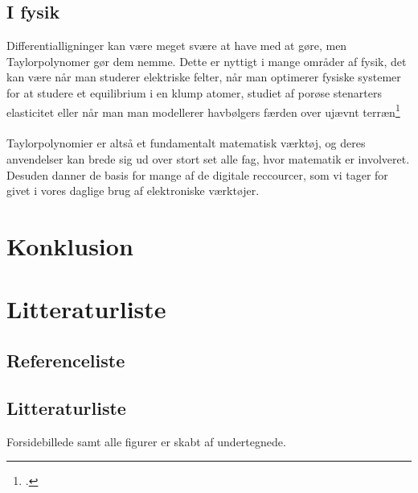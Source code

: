 \documentclass[12pt, a4paper]{article}
\begin{document}
\begin{refsection}
\subsection{I fysik}
Differentialligninger kan være meget svære at have med at gøre, men Taylorpolynomer gør dem nemme. Dette er nyttigt i mange områder af fysik, det kan være når man studerer elektriske felter, når man optimerer fysiske systemer for at studere et equilibrium i en klump atomer, studiet af porøse stenarters elasticitet eller når man man modellerer havbølgers færden over ujævnt terræn\footcite{applicationsoftaylor}\\
\\
Taylorpolynomier er altså et fundamentalt matematisk værktøj, og deres anvendelser kan brede sig ud over stort set alle fag, hvor matematik er involveret. Desuden danner de basis for mange af de digitale reccourcer, som vi tager for givet i vores daglige brug af elektroniske værktøjer.

\section{Konklusion} %
\newpage
\section{Litteraturliste}
\subsection{Referenceliste}
\printbibliography[title=Cited]
\end{refsection}
\subsection{Litteraturliste}
\nocite{*}
\printbibliography
Forsidebillede samt alle figurer er skabt af undertegnede.
\end{document}
